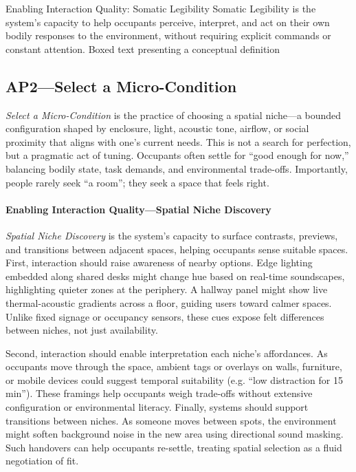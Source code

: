 \designbox
{Enabling Interaction Quality: Somatic Legibility}
{Somatic Legibility is the system’s capacity to help occupants perceive, interpret, and act on their own bodily responses to the environment, without requiring explicit commands or constant attention.}
{Boxed text presenting a conceptual definition}


\subsection{AP2---Select a Micro-Condition}
\textit{Select a Micro-Condition} is the practice of choosing a spatial niche---a bounded configuration shaped by enclosure, light, acoustic tone, airflow, or social proximity that aligns with one’s current needs. This is not a search for perfection, but a pragmatic act of tuning. Occupants often settle for ``good enough for now,'' balancing bodily state, task demands, and environmental trade-offs. Importantly, people rarely seek ``a room''; they seek a space that feels right.

\paragraph{Enabling Interaction Quality---Spatial Niche Discovery}
\textit{Spatial Niche Discovery} is the system’s capacity to surface contrasts, previews, and transitions between adjacent spaces, helping occupants sense suitable spaces. First, interaction should raise awareness of nearby options. Edge lighting embedded along shared desks might change hue based on real-time soundscapes, highlighting quieter zones at the periphery. A hallway panel might show live thermal-acoustic gradients across a floor, guiding users toward calmer spaces. Unlike fixed signage or occupancy sensors, these cues expose felt differences between niches, not just availability.

Second, interaction should enable interpretation each niche's affordances. As occupants move through the space, ambient tags or overlays on walls, furniture, or mobile devices could suggest temporal suitability (e.g. ``low distraction for 15 min''). These framings help occupants weigh trade-offs without extensive configuration or environmental literacy. Finally, systems should support transitions between niches. As someone moves between spots, the environment might soften background noise in the new area using directional sound masking. Such handovers can help occupants re-settle, treating spatial selection as a fluid negotiation of fit.

